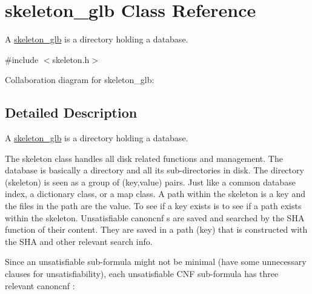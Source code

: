 \hypertarget{classskeleton__glb}{}\section{skeleton\+\_\+glb Class Reference}
\label{classskeleton__glb}


A \hyperlink{classskeleton__glb}{skeleton\+\_\+glb} is a directory holding a database.  




{\ttfamily \#include $<$skeleton.\+h$>$}



Collaboration diagram for skeleton\+\_\+glb\+:


\subsection{Detailed Description}
A \hyperlink{classskeleton__glb}{skeleton\+\_\+glb} is a directory holding a database. 

The skeleton class handles all disk related functions and management. The database is basically a directory and all its sub-\/directories in disk. The directory (skeleton) is seen as a group of (\textquotesingle{}\textquotesingle{}key\textquotesingle{}\textquotesingle{},\textquotesingle{}\textquotesingle{}value\textquotesingle{}\textquotesingle{}) pairs. Just like a common database \textquotesingle{}\textquotesingle{}index\textquotesingle{}\textquotesingle{}, a \textquotesingle{}\textquotesingle{}dictionary\textquotesingle{}\textquotesingle{} class, or a \textquotesingle{}\textquotesingle{}map\textquotesingle{}\textquotesingle{} class. A path within the skeleton is a \textquotesingle{}\textquotesingle{}key\textquotesingle{}\textquotesingle{} and the files in the path are the \textquotesingle{}\textquotesingle{}value\textquotesingle{}\textquotesingle{}. To see if a \textquotesingle{}\textquotesingle{}key\textquotesingle{}\textquotesingle{} exists is to see if a path exists within the skeleton. Unsatisfiable canoncnf s are saved and searched by the S\+HA function of their content. They are saved in a path (\textquotesingle{}\textquotesingle{}key\textquotesingle{}\textquotesingle{}) that is constructed with the S\+HA and other relevant search info.

Since an unsatisfiable sub-\/formula might not be minimal (have some unnecessary clauses for unsatisfiability), each unsatisfiable C\+NF sub-\/formula has three relevant canoncnf \+:


